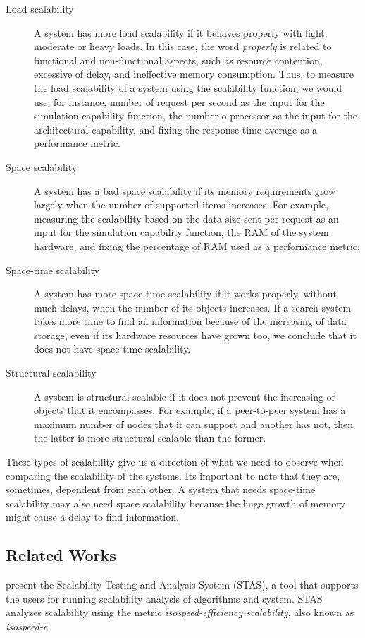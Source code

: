 \begin{description}
\item[Load scalability] A system has more load scalability if it behaves properly with light, moderate or heavy loads. In this case, the word \emph{properly} is related to functional and non-functional aspects, such as resource contention, excessive of delay, and ineffective memory consumption. Thus, to measure the load scalability of a system using the scalability function, we would use, for instance,  number of request per second as the input for the simulation capability function, the number o processor as the input for the architectural capability, and fixing the response time average as a performance metric.
\item[Space scalability]  A system has a bad space scalability if its memory requirements grow largely when the number of supported items increases. For example, measuring the scalability based on the data size sent per request as an input for the simulation capability function, the RAM of the system hardware, and fixing the percentage of RAM used as a performance metric.
\item[Space-time scalability] A system has more space-time scalability if it works properly, without much delays, when the number of its objects increases. If a search system takes more time to find an information because of the increasing of data storage, even if its hardware resources have grown too, we conclude that it does not have space-time scalability.
\item[Structural scalability] A system is structural scalable if it does not prevent the increasing of objects that it encompasses. For example, if a peer-to-peer system has a maximum number of nodes that it can support and another has not, then the latter is more structural scalable than the former.
\end{description}

These types of scalability give us a direction of what we need to observe when comparing the scalability of the systems. Its important to note that they are, sometimes, dependent from each other. A system that needs space-time scalability may also need space scalability because the huge growth of memory might cause a delay to find information.

\subsection{Related Works}

\cite{STAS} present the Scalability Testing and Analysis System (STAS), a tool that supports the users for running scalability analysis of algorithms and system. STAS analyzes scalability using the metric \emph{isospeed-efficiency scalability}, also known as \emph{isospeed-e}. 

